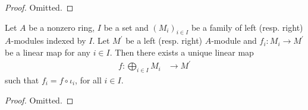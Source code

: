 \documentclass[12pt]{report}
\begin{document}
\begin{proof}
    Omitted.
\end{proof}

\begin{theorem}
    Let $A$ be a nonzero ring, $I$ be a set and $(M_i)_{i \in I}$ be a family of left (resp. right) $A$-modules indexed by $I$. Let $M^{\prime}$ be a left (resp. right) $A$-module and $f_i \colon M_i \to M^{\prime}$ be a linear map for any $i \in I$. Then there exists a unique linear map
    \[
        \begin{aligned}
            f \colon \bigoplus\limits_{i \in I} M_i &\longrightarrow M^{\prime}
        \end{aligned}
    \]
    such that $f_i = f \circ \iota_i$, for all $i \in I$.
\end{theorem}

\begin{proof}
    Omitted. 
\end{proof}
\end{document}
